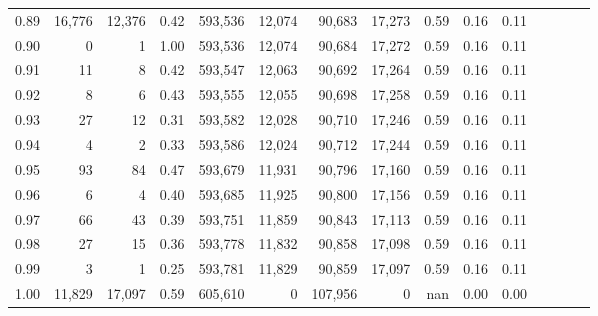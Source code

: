 \begin{tabular}{rrrcrrrrrrrrrrr}
0.89 &  16,776 &  12,376 &                                       0.42 &  593,536 &   12,074 &   90,683 &   17,273 &  0.59 &  0.16 &                         0.11 \\
0.90 &       0 &       1 &                                       1.00 &  593,536 &   12,074 &   90,684 &   17,272 &  0.59 &  0.16 &                         0.11 \\
0.91 &      11 &       8 &                                       0.42 &  593,547 &   12,063 &   90,692 &   17,264 &  0.59 &  0.16 &                         0.11 \\
0.92 &       8 &       6 &                                       0.43 &  593,555 &   12,055 &   90,698 &   17,258 &  0.59 &  0.16 &                         0.11 \\
0.93 &      27 &      12 &                                       0.31 &  593,582 &   12,028 &   90,710 &   17,246 &  0.59 &  0.16 &                         0.11 \\
0.94 &       4 &       2 &                                       0.33 &  593,586 &   12,024 &   90,712 &   17,244 &  0.59 &  0.16 &                         0.11 \\
0.95 &      93 &      84 &                                       0.47 &  593,679 &   11,931 &   90,796 &   17,160 &  0.59 &  0.16 &                         0.11 \\
0.96 &       6 &       4 &                                       0.40 &  593,685 &   11,925 &   90,800 &   17,156 &  0.59 &  0.16 &                         0.11 \\
0.97 &      66 &      43 &                                       0.39 &  593,751 &   11,859 &   90,843 &   17,113 &  0.59 &  0.16 &                         0.11 \\
0.98 &      27 &      15 &                                       0.36 &  593,778 &   11,832 &   90,858 &   17,098 &  0.59 &  0.16 &                         0.11 \\
0.99 &       3 &       1 &                                       0.25 &  593,781 &   11,829 &   90,859 &   17,097 &  0.59 &  0.16 &                         0.11 \\
1.00 &  11,829 &  17,097 &                                       0.59 &  605,610 &        0 &  107,956 &        0 &   nan &  0.00 &                         0.00 \\
\bottomrule
\end{tabular}
